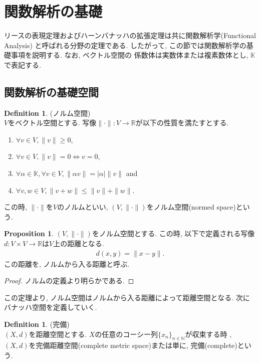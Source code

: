 \documentclass[11pt, a4paper, dvipdfmx]{jsarticle}
\theoremstyle{definition}
\newtheorem{Definition+}[Axiom+]{Definition}
\newtheorem{Proposition+}[Axiom+]{Proposition}
\newcommand{\N}{\mathbb{N}}
\newcommand{\R}{\mathbb{R}}
\newcommand{\K}{\mathbb{K}}
\newcommand{\normedsp}{(V, \|\cdot\|)}
\begin{document}
\section{関数解析の基礎}
リースの表現定理およびハーンバナッハの拡張定理は共に関数解析学(Functional Analysis)
と呼ばれる分野の定理である. したがって, この節では関数解析学の基礎事項を説明する. なお, ベクトル空間の
係数体は実数体または複素数体とし, $\K$で表記する.
\subsection{関数解析の基礎空間}
\begin{Definition+}(ノルム空間)\\
    $V$をベクトル空間とする. 写像$\|\cdot\|:V\to\R$が以下の性質を満たすとする.
    \begin{enumerate}
        \item $\forall v\in V, \|v\| \geq 0$,
        \item $\forall v\in V, \|v\| = 0 \iff v = 0$,
        \item $\forall \alpha\in\K, \forall v\in V, \|\alpha v\| = |\alpha|\|v\|$ and 
        \item $\forall v, w\in V, \|v + w\|\leq \|v\| + \|w\|$.
    \end{enumerate}
    この時, $\|\cdot\|$を$V$のノルムといい, $(V, \|\cdot\|)$をノルム空間(normed space)という.
\end{Definition+}
\begin{Proposition+}
    $\normedsp$をノルム空間とする. この時, 以下で定義される写像$d:V\times V\to\R$は$V$上の距離となる.
    \begin{align*}
        d(x, y) = \|x - y\|.
    \end{align*}
    この距離を, ノルムから入る距離と呼ぶ.
    \begin{proof}
        ノルムの定義より明らかである.
    \end{proof}
\end{Proposition+}
この定理より, ノルム空間はノルムから入る距離によって距離空間となる. 次にバナッハ空間を定義していく.
\begin{Definition+}(完備)\\
    $(X, d)$を距離空間とする. $X$の任意のコーシー列$\{x_{n}\}_{n\in\N}$が収束する時
    , $(X, d)$を完備距離空間(complete metric space)または単に, 完備(complete)という.
\end{Definition+}
\end{document}
